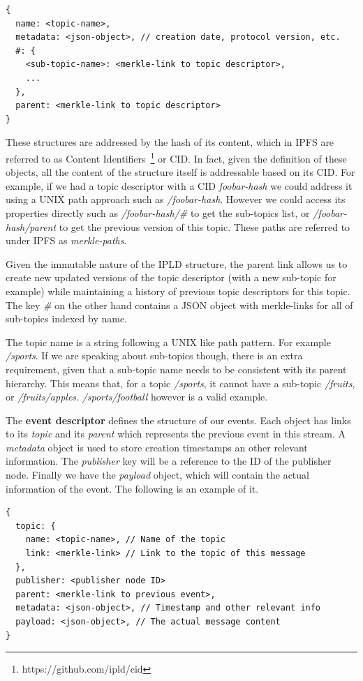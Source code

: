 \begin{verbatim}
{
  name: <topic-name>,
  metadata: <json-object>, // creation date, protocol version, etc.
  #: {
    <sub-topic-name>: <merkle-link to topic descriptor>,
    ...
  },
  parent: <merkle-link to topic descriptor>
}
\end{verbatim}

These structures are addressed by the hash of its content, which in IPFS
are referred to as Content Identifiers~\footnote{https://github.com/ipld/cid} or CID. In
fact, given the definition of these objects, all the content of the
structure itself is addressable based on its CID. For example, if we had
a topic descriptor with a CID
\emph{foobar-hash} we could
address it using a UNIX path approach such as
\emph{/foobar-hash}. However we
could access its properties directly such as
\emph{/foobar-hash/\#} to get the
sub-topics list, or
\emph{/foobar-hash/parent} to get
the previous version of this topic. These paths are referred to under
IPFS as \emph{merkle-paths}.

Given the immutable nature of the IPLD structure, the parent link allows
us to create new updated versions of the topic descriptor (with a new
sub-topic for example) while maintaining a history of previous topic
descriptors for this topic. The key \emph{\#} on the other hand
contains a JSON object with merkle-links for all of sub-topics indexed
by name.

The topic name is a string following a UNIX like path pattern. For
example \emph{/sports}. If we are speaking about sub-topics though,
there is an extra requirement, given that a sub-topic name needs to be
consistent with its parent hierarchy. This means that, for a topic
\emph{/sports}, it cannot have a sub-topic \emph{/fruits}, or
\emph{/fruits/apples}. \emph{/sports/football} however is a valid
example.

The \textbf{event descriptor} defines the structure of our events. Each
object has links to its \emph{topic} and its \emph{parent} which
represents the previous event in this stream. A \emph{metadata} object
is used to store creation timestamps an other relevant information. The
\emph{publisher} key will be a reference to the ID of the publisher
node. Finally we have the \emph{payload} object, which will contain the
actual information of the event. The following is an example of it.

\begin{verbatim}
{
  topic: {
    name: <topic-name>, // Name of the topic
    link: <merkle-link> // Link to the topic of this message
  },
  publisher: <publisher node ID>
  parent: <merkle-link to previous event>,
  metadata: <json-object>, // Timestamp and other relevant info
  payload: <json-object>, // The actual message content
}
\end{verbatim}

